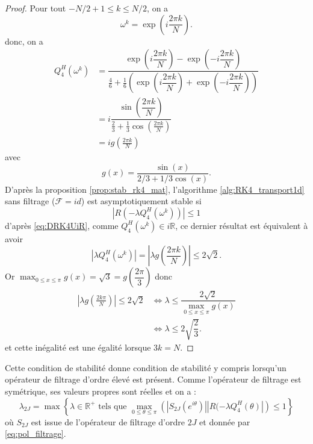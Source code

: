 \begin{proof}
Pour tout $-N/2 + 1 \leq k \leq N/2$, on a
\begin{equation}
\omega^k = \exp \left( i \dfrac{2 \pi k}{N} \right).
\end{equation}
donc, on a 
\begin{align*}
Q_4^H(\omega^k) & = \dfrac{\exp \left( i \dfrac{2 \pi k}{N} \right) - \exp \left(- i \dfrac{2 \pi k}{N} \right)}{\frac{4}{6} + \frac{1}{6} \left( \exp \left( i \dfrac{2 \pi k}{N} \right) + \exp \left( -i \dfrac{2 \pi k}{N} \right) \right)} \\
		& = i \dfrac{\sin \left( \dfrac{2 \pi k}{N} \right)}{\frac{2}{3} + \frac{1}{3} \cos \left( \frac{2 \pi k}{N} \right)}\\
		& = i g \left( \frac{2 \pi k}{N} \right)
\end{align*}
avec 
\begin{equation}
g(x) = \dfrac{\sin(x)}{2/3 + 1/3 \cos (x)}.
\end{equation}
D'après la proposition \ref{prop:stab_rk4_mat}, l'algorithme \ref{alg:RK4_transport1d} sans filtrage ($\mathcal{F} = id$) est asymptotiquement stable si
\begin{equation}
| R(- \lambda Q_4^H(\omega^k))| \leq 1
\end{equation}
d'après \eqref{eq:DRK4UiR}, comme $Q_4^H(\omega^k) \in i \mathbb{R}$, ce dernier résultat est équivalent à avoir 
\begin{equation}
|\lambda Q_4^H(\omega^k)| = |\lambda g \left( \frac{2\pi k}{N} \right)| \leq 2 \sqrt{2}.
\end{equation}
Or $\max_{0 \leq x \leq \pi} g(x) = \sqrt{3} = g \left(\dfrac{2 \pi}{3}\right)$ donc
\begin{align*}
| \lambda g \left( \frac{2 k \pi}{N} \right)| \leq 2 \sqrt{2} & \Leftrightarrow \lambda \leq \dfrac{2 \sqrt{2}}{\max_{0 \leq x \leq \pi} g(x)} \\
	& \Leftrightarrow \lambda \leq 2 \sqrt{\dfrac{2}{3}}. 
\end{align*}
et cette inégalité est une égalité lorsque $3k=N$.
\end{proof}

Cette condition de stabilité donne condition de stabilité y compris lorsqu'un opérateur de filtrage d'ordre élevé est présent. Comme l'opérateur de filtrage est symétrique, ses valeurs propres sont réelles et on a :
\begin{equation}
\lambda_{2J} = \max \left\lbrace \lambda \in \mathbb{R}^+ \text{ tels que } \max_{0 \leq \theta \leq \pi} \left(|S_{2J}(e^{i \theta})| | R(-\lambda Q_4^H(\theta) | \right) \leq 1 \right\rbrace
\end{equation}
où $S_{2J}$ est issue de l'opérateur de filtrage d'ordre $2J$ et donnée par \eqref{eq:pol_filtrage}.

